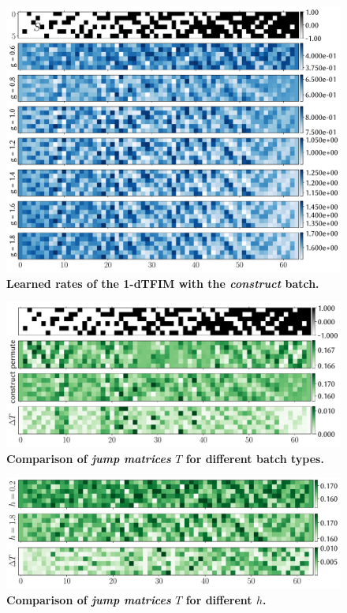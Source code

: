 \begin{figure}
	\centering
	\includegraphics[width=1\linewidth]{Chapter5/Figs/Vector/troub_rates}
	\caption[Learned rates of the 1-dTFIM with the \emph{construct} batch]{\textbf{Learned rates of the 1-dTFIM with the \emph{construct} batch.}}
	\label{fig:troubrates}
\end{figure}

\begin{figure}
	\centering
	\includegraphics[width=1\linewidth]{Chapter5/Figs/Vector/rate_compare1}
	\caption[Comparison of \emph{jump matrices} $T$ for different batch types]{\textbf{Comparison of \emph{jump matrices} $T$ for different batch types.}}
	\label{fig:ratecompare1}
\end{figure}

\begin{figure}
	\centering
	\includegraphics[width=1\linewidth]{Chapter5/Figs/Vector/rate_compare2}
	\caption[Comparison of \emph{jump matrices} $T$ for different batch types]{\textbf{Comparison of \emph{jump matrices} $T$ for different $h$.}}
	\label{fig:ratecompare2}
\end{figure}


